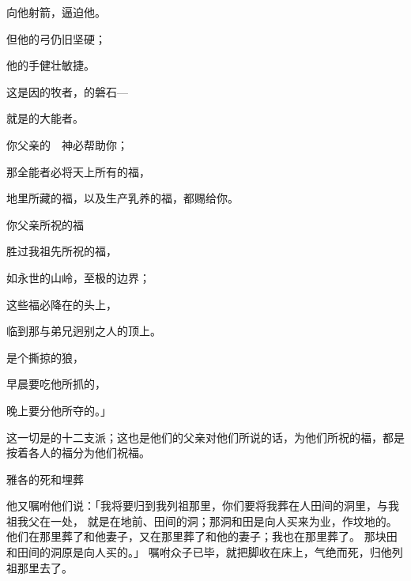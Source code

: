 {\par }{\Q 向他射箭，逼迫他。
\par }{\Q {}但他的弓仍旧坚硬；
\par }{\Q 他的手健壮敏捷。
\par }{\Q 这是因{}的牧者，{}的磐石—
\par }{\Q 就是{}的大能者。
\par }{\Q {}你父亲的　神必帮助你；
\par }{\Q 那全能者必将天上所有的福，
\par }{\Q 地里所藏的福，以及生产乳养的福，都赐给你。
\par }{\Q {}你父亲所祝的福
\par }{\Q 胜过我祖先所祝的福，
\par }{\Q 如永世的山岭，至极的边界；
\par }{\Q 这些福必降在{}的头上，
\par }{\Q 临到那与弟兄迥别之人的顶上。
\par }{\BB \par }{\Q {}是个撕掠的狼，
\par }{\Q 早晨要吃他所抓的，
\par }{\Q 晚上要分他所夺的。」
\par }{\PP {}这一切是{}的十二支派；这也是他们的父亲对他们所说的话，为他们所祝的福，都是按着各人的福分为他们祝福。
\par }{\SH 雅各的死和埋葬
\par }{\PP {}他又嘱咐他们说：「我将要归到我列祖那里，你们要将我葬在{}人{}田间的洞里，与我祖我父在一处，
就是在{}地{}前、{}田间的洞；那洞和田是{}向{}人{}买来为业，作坟地的。
他们在那里葬了{}和他妻子{}，又在那里葬了{}和他的妻子{}；我也在那里葬了{}。
那块田和田间的洞原是向{}人买的。」
嘱咐众子已毕，就把脚收在床上，气绝而死，归他列祖那里去了。

}
